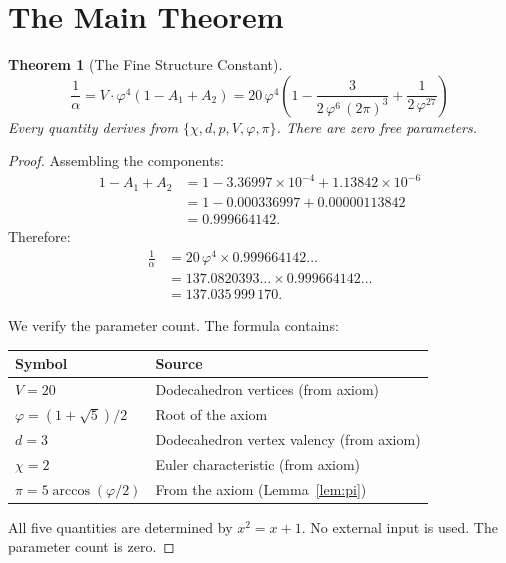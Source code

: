 \documentclass[11pt,a4paper]{article}
\theoremstyle{plain}
\newtheorem{theorem}{Theorem}[section]
\theoremstyle{definition}
\newcommand{\vp}{\varphi}
\begin{document}
\section{The Main Theorem}\label{sec:main}

\begin{theorem}[The Fine Structure Constant]\label{thm:main}
\[
  \boxed{\;
    \frac{1}{\alpha}
    = V \cdot \vp^4 \left(1 - A_1 + A_2\right)
    = 20\,\vp^4\!\left(
        1
        - \frac{3}{2\,\vp^6\,(2\pi)^3}
        + \frac{1}{2\,\vp^{27}}
      \right)
  \;}
\]
Every quantity derives from $\{\chi, d, p, V, \vp, \pi\}$.  There are
zero free parameters.
\end{theorem}

\begin{proof}
Assembling the components:
\begin{align*}
  1 - A_1 + A_2
  &= 1 - 3.36997 \times 10^{-4} + 1.13842 \times 10^{-6} \\
  &= 1 - 0.000336997 + 0.00000113842 \\
  &= 0.999664142.
\end{align*}
Therefore:
\begin{align*}
  \frac{1}{\alpha}
  &= 20\,\vp^4 \times 0.999664142\ldots \\
  &= 137.0820393\ldots \times 0.999664142\ldots \\
  &= 137.035\,999\,170.
\end{align*}

We verify the parameter count.  The formula contains:
\begin{center}
\begin{tabular}{@{}ll@{}}
\toprule
Symbol & Source \\
\midrule
$V = 20$ & Dodecahedron vertices (from axiom) \\
$\vp = (1+\sqrt{5})/2$ & Root of the axiom \\
$d = 3$ & Dodecahedron vertex valency (from axiom) \\
$\chi = 2$ & Euler characteristic (from axiom) \\
$\pi = 5\arccos(\vp/2)$ & From the axiom (Lemma~\ref{lem:pi}) \\
\bottomrule
\end{tabular}
\end{center}
All five quantities are determined by $x^2 = x + 1$.  No external input
is used.  The parameter count is zero.
\end{proof}
\end{document}
